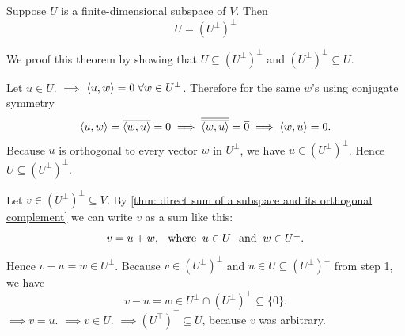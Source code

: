 \begin{thm}
  Suppose $U$ is a finite-dimensional subspace of $V$. Then
  \[
    U = (U^{\bot})^{\bot}
  \]
\end{thm}
\begin{prf}
  We proof this theorem by showing that $U \subseteq (U^{\bot})^{\bot}$ and $ (U^{\bot})^{\bot} \subseteq U$.

   Let $u \in U$. $\implies$ $\left \langle u, w \right \rangle=0 \; \forall w \in U^{\bot}$.
  Therefore for the same $w$'s using conjugate symmetry
  \[
    \left \langle u, w \right \rangle=\overline{\left \langle w, u \right \rangle} =0 \implies
    \overline{\overline{\left \langle w, u \right \rangle}} =\overline{0} \implies
    \left \langle w, u \right \rangle = 0.
  \]
  Because $u$ is orthogonal to every vector
  $w$ in $U^{\bot}$, we have $u \in (U^{\bot})^{\bot}$. Hence $U \subseteq (U^{\bot})^{\bot}$.

   Let $v \in (U^{\bot})^{\bot} \subseteq V.$ By \ref{thm: direct sum of a subspace and its orthogonal complement} we can write $v$ as a sum like this:
  \[
    v = u + w, \;\;\, \text{where}\;\; u \in U \;\;\, \text{and}\;\; w \in U^{\bot}.
  \]

  Hence $v-u=w \in U^\bot$. Because
  $v \in (U^\bot)^\bot$ and $u \in U \subseteq (U^\bot)^\bot$ from step 1, we have
  \[
    v-u=w \in U^\bot \cap (U^\bot)^\bot \subseteq \{0\}.
  \]
  $\implies v=u.$ $\implies v \in U.$ $\implies (U^\top)^\top \subseteq U$, because $v$ was arbitrary.
\end{prf}